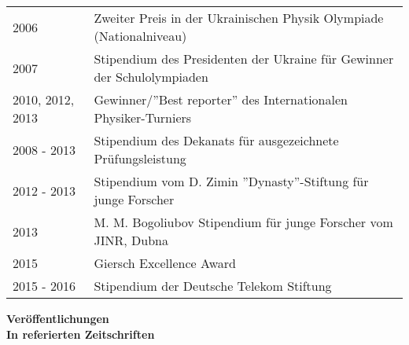 \begin{lebenslauf}
\begin{tabular}{m{3cm}m{13cm}}
2006  & Zweiter Preis in der Ukrainischen Physik Olympiade (Nationalniveau) \\
2007  & Stipendium des Presidenten der Ukraine f\"ur Gewinner der Schulolympiaden \\
2010, 2012, 2013  & Gewinner/''Best reporter'' des Internationalen Physiker-Turniers \\ %
2008 - 2013 & Stipendium des Dekanats f\"ur ausgezeichnete Pr\"ufungsleistung \\
2012 - 2013 & Stipendium vom D. Zimin ''Dynasty''-Stiftung f\"ur junge Forscher \\
2013        & M. M. Bogoliubov Stipendium f\"ur junge Forscher vom JINR, Dubna \\
2015        & Giersch Excellence Award \\
2015 - 2016 & Stipendium der Deutsche Telekom Stiftung  \\
\end{tabular}

\newpage

{\Large \textbf{Ver\"offentlichungen}} \\

\textbf{In referierten Zeitschriften}


\end{lebenslauf}
